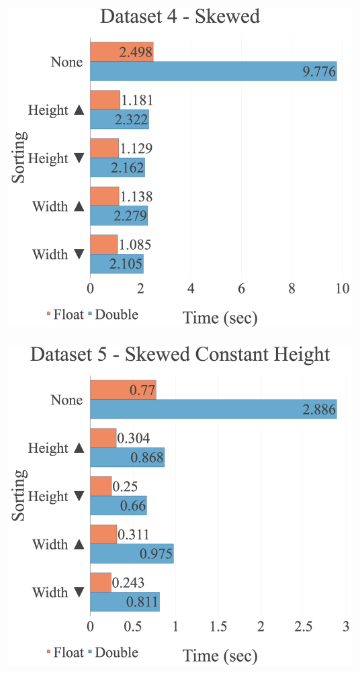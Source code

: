 \begin{figure}[H]
\begin{adjustwidth}{-2cm}{-2cm}
\begin{subfigure}{.62\textwidth}
  \centering
  \includegraphics[width=1\textwidth]{img/experiments/option-sorts-4_SKEWED.png}
\end{subfigure}
\begin{subfigure}{.62\textwidth}
  \centering
  \includegraphics[width=1\textwidth]{img/experiments/option-sorts-5_SKEWEDCONSTHEIGHT.png}

\end{subfigure}
\end{adjustwidth}
\end{figure}
